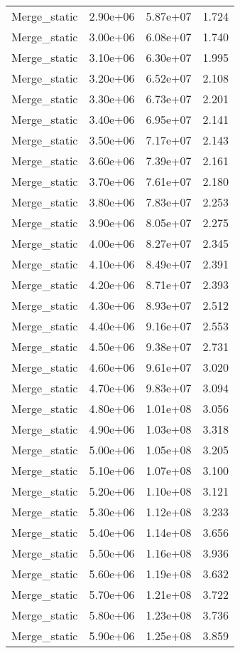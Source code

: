 \begin{table}
\begin{tabular}{llll}
Merge_static & 2.90e+06 & 5.87e+07 & 1.724 \\
Merge_static & 3.00e+06 & 6.08e+07 & 1.740 \\
Merge_static & 3.10e+06 & 6.30e+07 & 1.995 \\
Merge_static & 3.20e+06 & 6.52e+07 & 2.108 \\
Merge_static & 3.30e+06 & 6.73e+07 & 2.201 \\
Merge_static & 3.40e+06 & 6.95e+07 & 2.141 \\
Merge_static & 3.50e+06 & 7.17e+07 & 2.143 \\
Merge_static & 3.60e+06 & 7.39e+07 & 2.161 \\
Merge_static & 3.70e+06 & 7.61e+07 & 2.180 \\
Merge_static & 3.80e+06 & 7.83e+07 & 2.253 \\
Merge_static & 3.90e+06 & 8.05e+07 & 2.275 \\
Merge_static & 4.00e+06 & 8.27e+07 & 2.345 \\
Merge_static & 4.10e+06 & 8.49e+07 & 2.391 \\
Merge_static & 4.20e+06 & 8.71e+07 & 2.393 \\
Merge_static & 4.30e+06 & 8.93e+07 & 2.512 \\
Merge_static & 4.40e+06 & 9.16e+07 & 2.553 \\
Merge_static & 4.50e+06 & 9.38e+07 & 2.731 \\
Merge_static & 4.60e+06 & 9.61e+07 & 3.020 \\
Merge_static & 4.70e+06 & 9.83e+07 & 3.094 \\
Merge_static & 4.80e+06 & 1.01e+08 & 3.056 \\
Merge_static & 4.90e+06 & 1.03e+08 & 3.318 \\
Merge_static & 5.00e+06 & 1.05e+08 & 3.205 \\
Merge_static & 5.10e+06 & 1.07e+08 & 3.100 \\
Merge_static & 5.20e+06 & 1.10e+08 & 3.121 \\
Merge_static & 5.30e+06 & 1.12e+08 & 3.233 \\
Merge_static & 5.40e+06 & 1.14e+08 & 3.656 \\
Merge_static & 5.50e+06 & 1.16e+08 & 3.936 \\
Merge_static & 5.60e+06 & 1.19e+08 & 3.632 \\
Merge_static & 5.70e+06 & 1.21e+08 & 3.722 \\
Merge_static & 5.80e+06 & 1.23e+08 & 3.736 \\
Merge_static & 5.90e+06 & 1.25e+08 & 3.859 \\

\end{tabular}
\end{table}
